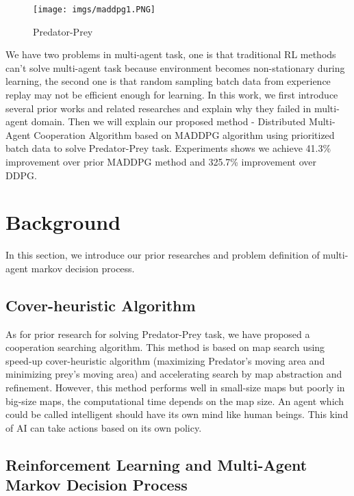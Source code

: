\documentclass[11pt,twocolumn]{jarticle} %
\begin{document}
\begin{figure}[t]
 \begin{center}
  \texttt{[image: imgs/maddpg1.PNG]}
  \caption{Predator-Prey}
  \label{fig:adversaryChasing}
 \end{center}
\end{figure}

We have two problems in multi-agent task, one is that traditional RL methods can't solve multi-agent task because environment becomes non-stationary during learning, the second one is that random sampling batch data from experience replay may not be efficient enough for learning. In this work, we first introduce several prior works and related researches and explain why they failed in multi-agent domain. Then we will explain our proposed method - Distributed Multi-Agent Cooperation Algorithm based on MADDPG algorithm\cite{maddpg} using prioritized batch data to solve Predator-Prey task. Experiments shows we achieve 41.3\% improvement over prior MADDPG method and 325.7\% improvement over DDPG.\par

\section{Background} 
In this section, we introduce our prior researches and problem definition of multi-agent markov decision process.
\subsection{Cover-heuristic Algorithm\cite{cover}}
As for prior research for solving Predator-Prey task, we have proposed a cooperation searching algorithm. This method is based on map search using speed-up cover-heuristic algorithm\cite{cover-heuristic} (maximizing Predator's moving area and minimizing prey's moving area) and accelerating search by map abstraction and refinement. However, this method performs well in small-size maps but poorly in big-size maps, the computational time depends on the map size. An agent which could be called intelligent should have its own mind like human beings. This kind of AI can take actions based on its own policy.\par


\subsection{Reinforcement Learning and Multi-Agent Markov Decision Process}
\end{document}
